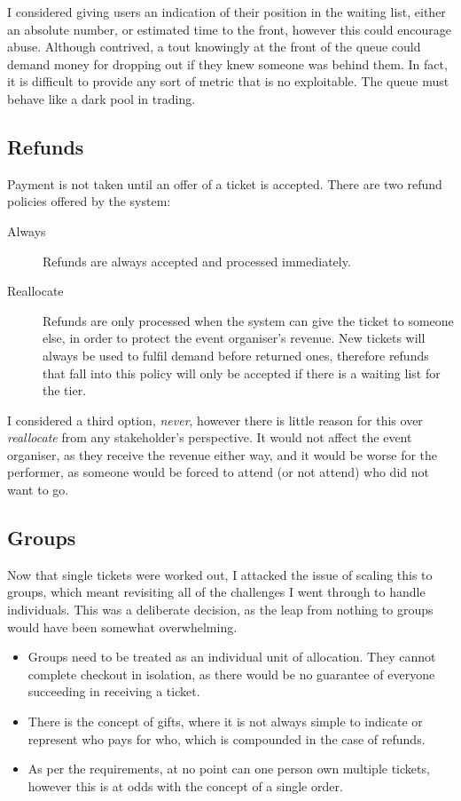 \documentclass[12pt,a4]{bhamdissertation}
\begin{document}
I considered giving users an indication of their position in the waiting list, either an absolute number, or estimated time to the front, however this could encourage abuse. Although contrived, a tout knowingly at the front of the queue could demand money for dropping out if they knew someone was behind them. In fact, it is difficult to provide any sort of metric that is no exploitable. The queue must behave like a dark pool in trading.

\subsection{Refunds}

Payment is not taken until an offer of a ticket is accepted. There are two refund policies offered by the system:

\begin{description}
    \item[Always] Refunds are always accepted and processed immediately.
    \item[Reallocate] Refunds are only processed when the system can give the ticket to someone else, in order to protect the event organiser's revenue. New tickets will always be used to fulfil demand before returned ones, therefore refunds that fall into this policy will only be accepted if there is a waiting list for the tier.
\end{description}

I considered a third option, \textit{never}, however there is little reason for this over \textit{reallocate} from any stakeholder's perspective. It would not affect the event organiser, as they receive the revenue either way, and it would be worse for the performer, as someone would be forced to attend (or not attend) who did not want to go.

\subsection{Groups}

Now that single tickets were worked out, I attacked the issue of scaling this to groups, which meant revisiting all of the challenges I went through to handle individuals. This was a deliberate decision, as the leap from nothing to groups would have been somewhat overwhelming.

\begin{itemize}
    \item Groups need to be treated as an individual unit of allocation. They cannot complete checkout in isolation, as there would be no guarantee of everyone succeeding in receiving a ticket.
    \item There is the concept of gifts, where it is not always simple to indicate or represent who pays for who, which is compounded in the case of refunds.
    \item As per the requirements, at no point can one person own multiple tickets, however this is at odds with the concept of a single order.
\end{itemize}
\end{document}
